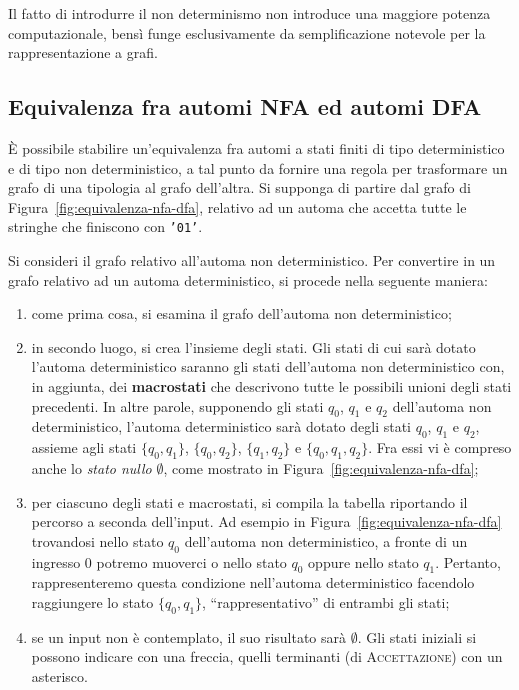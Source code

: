 \documentclass[10pt]{\classname}
\theoremstyle{definition}
\theoremstyle{definition}
\begin{document}
Il fatto di introdurre il non determinismo non introduce una maggiore potenza
computazionale, bensì funge esclusivamente da semplificazione notevole per la
rappresentazione a grafi.

\subsection{Equivalenza fra automi NFA ed automi DFA}

È possibile stabilire un'equivalenza fra automi a stati finiti di tipo
deterministico e di tipo non deterministico, a tal punto da fornire una regola
per trasformare un grafo di una tipologia al grafo dell'altra. Si supponga di
partire dal grafo di Figura~\ref{fig:equivalenza-nfa-dfa}, relativo ad un
automa che accetta tutte le stringhe che finiscono con \texttt{'01'}.

Si consideri il grafo relativo all'automa non deterministico. Per convertire in
un grafo relativo ad un automa deterministico, si procede nella seguente
maniera:
\begin{enumerate}
    \item come prima cosa, si esamina il grafo dell'automa non deterministico;
    \item in secondo luogo, si crea l'insieme degli stati. Gli stati di cui
        sarà dotato l'automa deterministico saranno gli stati dell'automa non
        deterministico con, in aggiunta, dei \textbf{macrostati} che descrivono
        tutte le possibili unioni degli stati precedenti. In altre parole,
        supponendo gli stati $q_0$, $q_1$ e $q_2$ dell'automa non
        deterministico, l'automa deterministico sarà dotato degli stati $q_0$,
        $q_1$ e $q_2$, assieme agli stati $\{q_0, q_1\}$, $\{q_0, q_2\}$,
        $\{q_1, q_2\}$ e $\{q_0, q_1, q_2\}$. Fra essi vi è compreso
        anche lo \emph{stato nullo} $\emptyset$, come mostrato in
        Figura~\ref{fig:equivalenza-nfa-dfa};
    \item per ciascuno degli stati e macrostati, si compila la tabella
        riportando il percorso a seconda dell'input. Ad esempio in
        Figura~\ref{fig:equivalenza-nfa-dfa} trovandosi nello stato $q_0$
        dell'automa non deterministico, a fronte di un ingresso 0 potremo
        muoverci o nello stato $q_0$ oppure nello stato $q_1$. Pertanto,
        rappresenteremo questa condizione nell'automa deterministico facendolo
        raggiungere lo stato $\{q_0, q_1\}$, ``rappresentativo'' di entrambi
        gli stati;
    \item se un input non è contemplato, il suo risultato sarà $\emptyset$. Gli
        stati iniziali si possono indicare con una freccia, quelli terminanti
        (di \textsc{Accettazione}) con un asterisco.
\end{enumerate}
\end{document}

